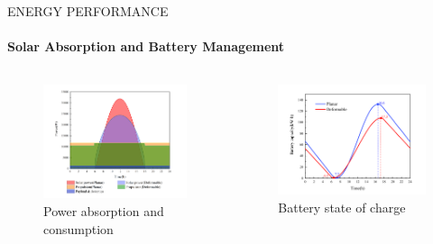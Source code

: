 \documentclass{beamer}
\begin{document}
\begin{frame}{ENERGY PERFORMANCE}
    \framesubtitle{Solar Absorption and Battery Management}
    
    \begin{columns}
        \begin{column}{0.5\textwidth}
            \begin{figure}
                \centering
                \includegraphics[width=\textwidth]{power_curve.png}
                \caption{Power absorption and consumption}
            \end{figure}
        \end{column}
        \begin{column}{0.5\textwidth}
            \begin{figure}
                \centering
                \includegraphics[width=\textwidth]{soc_curve.png}
                \caption{Battery state of charge}
            \end{figure}
        \end{column}
    \end{columns}
\end{frame}
\end{document}
